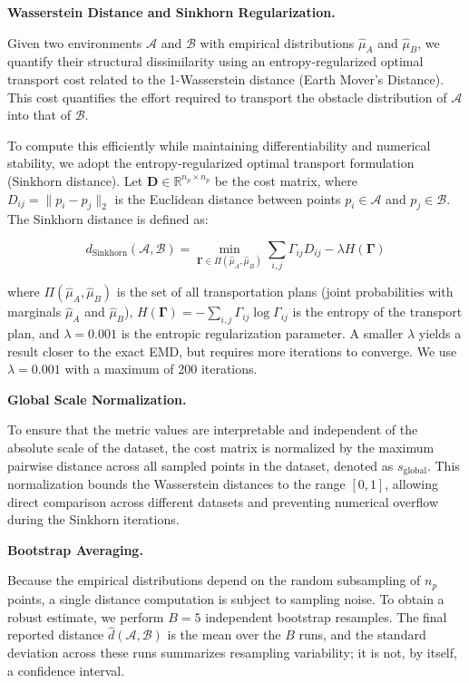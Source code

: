 \documentclass[robotics,article,submit,pdftex,moreauthors]{Definitions/mdpi}
\begin{document}
\textbf{Wasserstein Distance and Sinkhorn Regularization.}

Given two environments \(\mathcal{A}\) and \(\mathcal{B}\) with empirical distributions \(\hat{\mu}_A\) and \(\hat{\mu}_B\), we quantify their structural dissimilarity using an entropy-regularized optimal transport cost related to the 1-Wasserstein distance (Earth Mover's Distance). This cost quantifies the effort required to transport the obstacle distribution of \(\mathcal{A}\) into that of \(\mathcal{B}\). 

To compute this efficiently while maintaining differentiability and numerical stability, we adopt the entropy-regularized optimal transport formulation (Sinkhorn distance). Let \(\mathbf{D} \in \mathbb{R}^{n_p \times n_p}\) be the cost matrix, where \(D_{ij} = \|p_i - p_j\|_2\) is the Euclidean distance between points \(p_i \in \mathcal{A}\) and \(p_j \in \mathcal{B}\). The Sinkhorn distance is defined as:

\begin{equation}
    d_{\text{Sinkhorn}}(\mathcal{A}, \mathcal{B}) = \min_{\boldsymbol{\Gamma} \in \Pi(\hat{\mu}_A, \hat{\mu}_B)} \sum_{i,j} \Gamma_{ij} D_{ij} - \lambda H(\boldsymbol{\Gamma})
    \label{eq:sinkhorn}
\end{equation}

where \(\Pi(\hat{\mu}_A, \hat{\mu}_B)\) is the set of all transportation plans (joint probabilities with marginals \(\hat{\mu}_A\) and \(\hat{\mu}_B\)), \(H(\boldsymbol{\Gamma}) = -\sum_{i,j} \Gamma_{ij} \log \Gamma_{ij}\) is the entropy of the transport plan, and \(\lambda = 0.001\) is the entropic regularization parameter. A smaller \(\lambda\) yields a result closer to the exact EMD, but requires more iterations to converge. We use \(\lambda = 0.001\) with a maximum of 200 iterations.

\textbf{Global Scale Normalization.}

To ensure that the metric values are interpretable and independent of the absolute scale of the dataset, the cost matrix is normalized by the maximum pairwise distance across all sampled points in the dataset, denoted as \(s_{\text{global}}\). This normalization bounds the Wasserstein distances to the range \([0, 1]\), allowing direct comparison across different datasets and preventing numerical overflow during the Sinkhorn iterations.

\textbf{Bootstrap Averaging.}

Because the empirical distributions depend on the random subsampling of \(n_p\) points, a single distance computation is subject to sampling noise. To obtain a robust estimate, we perform \(B=5\) independent bootstrap resamples. The final reported distance \(\hat{d}(\mathcal{A}, \mathcal{B})\) is the mean over the \(B\) runs, and the standard deviation across these runs summarizes resampling variability; it is not, by itself, a confidence interval.
\end{document}
